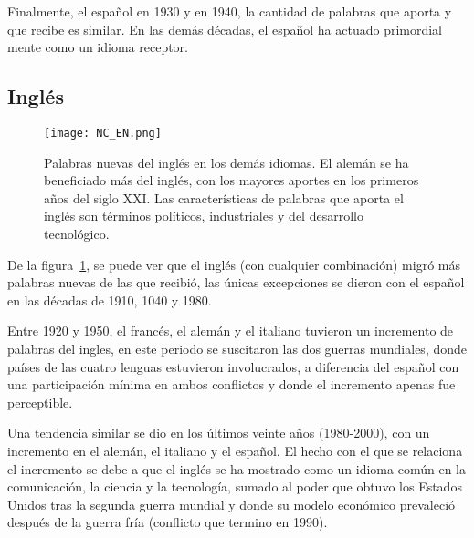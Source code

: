 Finalmente, el español en 1930 y en 1940, la cantidad de palabras que aporta y
que recibe es similar.  En las demás décadas, el español ha actuado primordial
mente como un idioma receptor. 

\subsection{Inglés} %

\begin{figure} [h!] %
	\centering
	\texttt{[image: NC\_EN.png]}
	\caption{Palabras nuevas del inglés en los demás idiomas. El alemán se ha beneficiado más del inglés, con los mayores aportes en los primeros años del siglo XXI. Las características de palabras que aporta el inglés son términos políticos, industriales y del desarrollo tecnológico.}
	\label{fig.NC_EN}
\end{figure} %


De la figura~\ref{fig.NC_EN}, se puede ver que el inglés (con cualquier combinación) migró más palabras nuevas de las que recibió, las únicas excepciones se dieron  con el español en las décadas de 1910, 1040 y 1980. 

Entre 1920 y 1950, el francés, el alemán y el italiano tuvieron un incremento de palabras del ingles, en este periodo se suscitaron las dos guerras mundiales, donde países de las cuatro lenguas estuvieron involucrados, a diferencia del español con una participación mínima en ambos conflictos y donde el incremento apenas fue perceptible.   

Una tendencia similar se dio en los últimos veinte años (1980-2000), con un incremento en el alemán, el italiano y el español. El hecho con el que se relaciona el incremento se debe a que el inglés se ha mostrado como un idioma común en la comunicación, la ciencia y la tecnología,  sumado al poder que obtuvo los Estados Unidos tras la segunda guerra mundial y donde su modelo económico prevaleció después de la guerra fría (conflicto que termino en 1990). 



